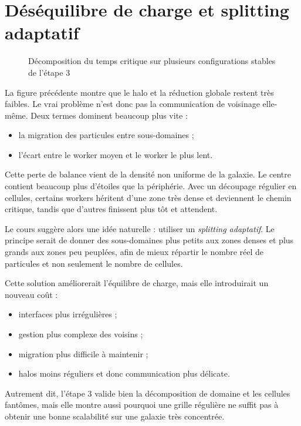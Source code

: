 \section{Déséquilibre de charge et splitting adaptatif}

\begin{figure}[H]
    \centering
    
    \caption{Décomposition du temps critique sur plusieurs configurations stables de l'étape 3}
    \label{fig:stage3_breakdown}
\end{figure}

La figure précédente montre que le halo et la réduction globale restent très faibles. Le vrai problème n'est donc pas la communication de voisinage elle-même. Deux termes dominent beaucoup plus vite :
\begin{itemize}
    \item la migration des particules entre sous-domaines ;
    \item l'écart entre le worker moyen et le worker le plus lent.
\end{itemize}

Cette perte de balance vient de la densité non uniforme de la galaxie. Le centre contient beaucoup plus d'étoiles que la périphérie. Avec un découpage régulier en cellules, certains workers héritent d'une zone très dense et deviennent le chemin critique, tandis que d'autres finissent plus tôt et attendent.

Le cours suggère alors une idée naturelle : utiliser un \textit{splitting adaptatif}. Le principe serait de donner des sous-domaines plus petits aux zones denses et plus grands aux zones peu peuplées, afin de mieux répartir le nombre réel de particules et non seulement le nombre de cellules.

Cette solution améliorerait l'équilibre de charge, mais elle introduirait un nouveau coût :
\begin{itemize}
    \item interfaces plus irrégulières ;
    \item gestion plus complexe des voisins ;
    \item migration plus difficile à maintenir ;
    \item halos moins réguliers et donc communication plus délicate.
\end{itemize}

Autrement dit, l'étape 3 valide bien la décomposition de domaine et les cellules fantômes, mais elle montre aussi pourquoi une grille régulière ne suffit pas à obtenir une bonne scalabilité sur une galaxie très concentrée.
